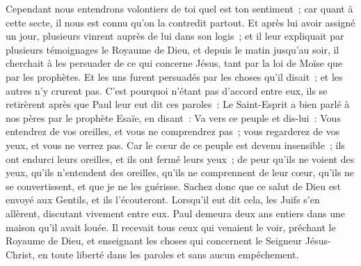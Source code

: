 \begin{multicols}{2}
Cependant nous entendrons volontiers de toi quel est ton sentiment~; car quant à cette secte, il nous est connu qu'on la contredit partout.
Et après lui avoir assigné un jour, plusieurs vinrent auprès de lui dans son logis~; et il leur expliquait par plusieurs témoignages le Royaume de Dieu, et depuis le matin jusqu'au soir, il cherchait à les persuader de ce qui concerne Jésus, tant par la loi de Moïse que par les prophètes.
Et les uns furent persuadés par les choses qu'il disait~; et les autres n'y crurent pas.
C'est pourquoi n'étant pas d'accord entre eux, ils se retirèrent après que Paul leur eut dit ces paroles~: Le Saint-Esprit a bien parlé à nos pères par le prophète Esaïe, en disant~:
Va vers ce peuple et dis-lui~: Vous entendrez de vos oreilles, et vous ne comprendrez pas~; vous regarderez de vos yeux, et vous ne verrez pas.
Car le cœur de ce peuple est devenu insensible~; ils ont endurci leurs oreilles, et ils ont fermé leurs yeux~; de peur qu'ils ne voient des yeux, qu'ils n'entendent des oreilles, qu'ils ne comprennent de leur cœur, qu'ils ne se convertissent, et que je ne les guérisse.
Sachez donc que ce salut de Dieu est envoyé aux Gentils, et ils l'écouteront.
Lorsqu'il eut dit cela, les Juifs s'en allèrent, discutant vivement entre eux.
Paul demeura deux ans entiers dans une maison qu'il avait louée. Il recevait tous ceux qui venaient le voir,
prêchant le Royaume de Dieu, et enseignant les choses qui concernent le Seigneur Jésus-Christ, en toute liberté dans les paroles et sans aucun empêchement.
\PPE{}
\end{multicols}
